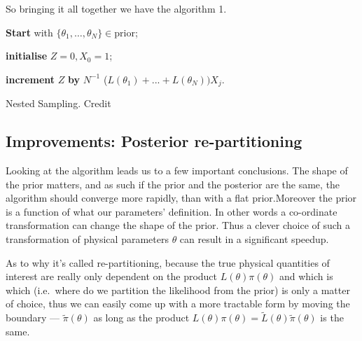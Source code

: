 \documentclass[11pt, reprint]{revtex4-2}
\begin{document}
So bringing it all together we have the algorithm 1.
\begin{algorithm}
  \SetAlgoLined%
\textbf{Start} with  $\lbrace\theta_1, \ldots , \theta_N\rbrace \in \text{prior}$;

\textbf{initialise} $Z = 0, X_0 = 1$;


\textbf{increment} $Z$ \textbf{by} $N^{-1}$ ($L(\theta_1 ) + . . . + L(\theta_N )) X_j$.
\caption{Nested Sampling. Credit\cite{skilling2006}}
\end{algorithm}
\goodbreak%

\subsection{Improvements: Posterior re-partitioning}\label{sec-4-2}

Looking at the algorithm\cite{chen-ferroz-hobson} leads us to a
few important conclusions. The shape of the prior matters, and as such
if the prior and the posterior are the same, the algorithm should
converge more rapidly, than with a flat prior.Moreover the prior is a
function of what our parameters' definition. In other words a
co-ordinate transformation can change the shape of the prior. Thus a
clever choice of such a transformation of physical parameters
\( \theta \) can result in a significant speedup.

As to why it's called re-partitioning, because the true physical
quantities of interest are really only dependent on the product
\( L (\theta) \pi (\theta) \) and which is which (i.e.~where do we partition the
likelihood from the prior) is only a matter of choice, thus we can
easily come up with a more tractable form by moving the boundary ---
\( \tilde{\pi} (\theta) \) as long as the product
\( L (\theta ) \pi (\theta) = \tilde{L} (\theta) \tilde{\pi} (\theta) \) is the same.
\end{document}
